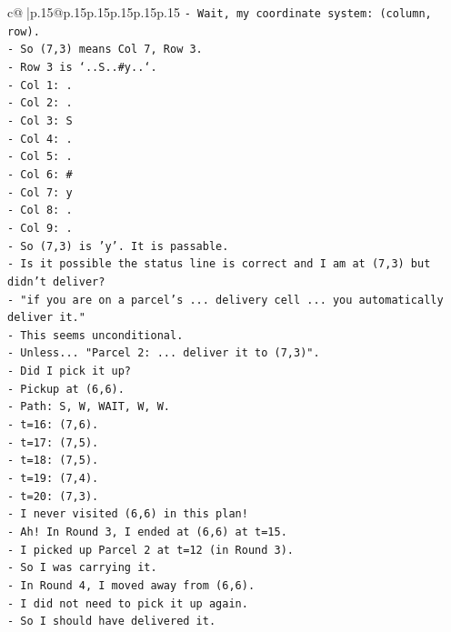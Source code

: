 \documentclass{article}
\begin{document}
{\begin{supertabular}{c@{$\;$}|p{.15\linewidth}@{}p{.15\linewidth}p{.15\linewidth}p{.15\linewidth}p{.15\linewidth}p{.15\linewidth}}
{{{\texttt{{-} Wait, my coordinate system: (column, row).} \\
\texttt{{-} So (7,3) means Col 7, Row 3.} \\
\texttt{{-} Row 3 is `..S..\#y..`.} \\
\texttt{{-} Col 1: .} \\
\texttt{{-} Col 2: .} \\
\texttt{{-} Col 3: S} \\
\texttt{{-} Col 4: .} \\
\texttt{{-} Col 5: .} \\
\texttt{{-} Col 6: \#} \\
\texttt{{-} Col 7: y} \\
\texttt{{-} Col 8: .} \\
\texttt{{-} Col 9: .} \\
\texttt{{-} So (7,3) is 'y'. It is passable.} \\
\texttt{{-} Is it possible the status line is correct and I am at (7,3) but didn't deliver?} \\
\texttt{{-} "if you are on a parcel's ... delivery cell ... you automatically deliver it."} \\
\texttt{{-} This seems unconditional.} \\
\texttt{{-} Unless... "Parcel 2: ... deliver it to (7,3)".} \\
\texttt{{-} Did I pick it up?} \\
\texttt{{-} Pickup at (6,6).} \\
\texttt{{-} Path: S, W, WAIT, W, W.} \\
\texttt{{-} t=16: (7,6).} \\
\texttt{{-} t=17: (7,5).} \\
\texttt{{-} t=18: (7,5).} \\
\texttt{{-} t=19: (7,4).} \\
\texttt{{-} t=20: (7,3).} \\
\texttt{{-} I never visited (6,6) in this plan!} \\
\texttt{{-} Ah! In Round 3, I ended at (6,6) at t=15.} \\
\texttt{{-} I picked up Parcel 2 at t=12 (in Round 3).} \\
\texttt{{-} So I was carrying it.} \\
\texttt{{-} In Round 4, I moved away from (6,6).} \\
\texttt{{-} I did not need to pick it up again.} \\
\texttt{{-} So I should have delivered it.} \\
}}}
\end{supertabular}}
\end{document}
